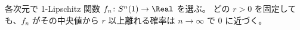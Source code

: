 各次元で 1-Lipschitz 関数 $f_n\colon S^n(1)\to\Real$ を選ぶ。
どの $r>0$ を固定しても、$f_n$ がその中央値から $r$ 以上離れる確率は
$n\to\infty$ で $0$ に近づく。
